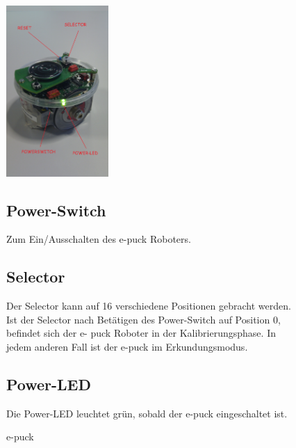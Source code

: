 \documentclass[10pt,a4paper]{article}
\begin{document}
 	\begin{figure}[htbp]
		\begin{minipage}[t]{6.5cm}
			\vspace{0pt}
			\includegraphics[height=6.5cm]{images/puck1.png} 
			\caption{e-puck}
		\end{minipage}
		\hfill
		\begin{minipage}[t]{0.5\textwidth}
			\vspace{5pt}
				\subsection{Power-Switch}
					Zum Ein/Ausschalten des e-puck Roboters.
				\subsection{Selector}
					Der Selector kann auf 16 verschiedene Positionen gebracht werden. Ist der Selector nach Bet\"atigen des Power-Switch auf Position 0, befindet sich der e-
					puck Roboter in der Kalibrierungsphase. In jedem anderen Fall ist der e-puck im Erkundungsmodus.
				\subsection{Power-LED}
					Die Power-LED leuchtet gr\"un, sobald der e-puck eingeschaltet ist.
		\end{minipage}
   \end{figure}
   
\end{document}
